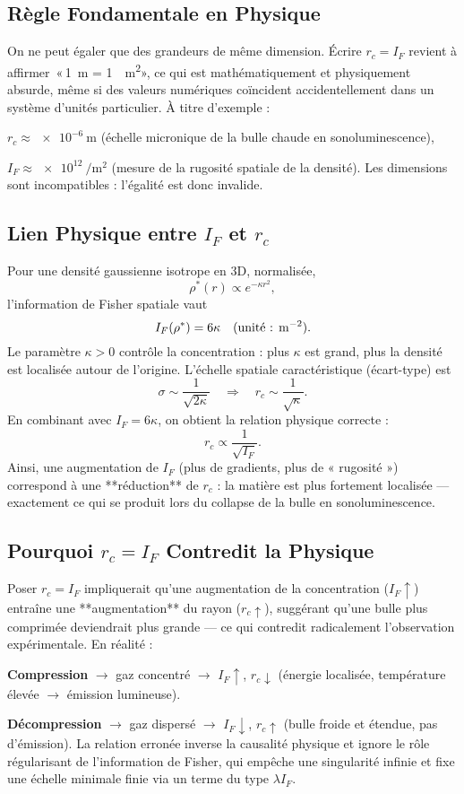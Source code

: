 \documentclass[a4paper,12pt]{article}
\begin{document}
\subsection{Règle Fondamentale en Physique}
On ne peut égaler que des grandeurs de même dimension.
Écrire \( r_c = I_F \) revient à affirmer~\textup{«}\,\SI{1}{\meter} = \SI{1}{\per\meter\squared}\textup{»},
ce qui est mathématiquement et physiquement absurde,
même si des valeurs numériques coïncident accidentellement dans un système d’unités particulier.
À titre d’exemple :
\item \( r_c \approx \SI{e-6}{\meter} \) (échelle micronique de la bulle chaude en sonoluminescence),
    \item \( I_F \approx \SI{e12}{\per\meter\squared} \) (mesure de la rugosité spatiale de la densité).
Les dimensions sont incompatibles : l’égalité est donc invalide.

\subsection{Lien Physique entre \( I_F \) et \( r_c \)}
Pour une densité gaussienne isotrope en 3D, normalisée,
\[
\rho^*(r) \propto e^{-\kappa r^2},
\]
l’information de Fisher spatiale vaut
\[
I_F(\rho^*) = 6\kappa \quad \text{(unité : \si{\per\meter\squared})}.
\]
Le paramètre \( \kappa > 0 \) contrôle la concentration : plus \( \kappa \) est grand, plus la densité est localisée autour de l’origine.
L’échelle spatiale caractéristique (écart-type) est
\[
\sigma \sim \frac{1}{\sqrt{2\kappa}} \quad \Rightarrow \quad r_c \sim \frac{1}{\sqrt{\kappa}}.
\]
En combinant avec \( I_F = 6\kappa \), on obtient la relation physique correcte :
\[
r_c \propto \frac{1}{\sqrt{I_F}}.
\]
Ainsi, une augmentation de \( I_F \) (plus de gradients, plus de « rugosité ») correspond à une **réduction** de \( r_c \) :
la matière est plus fortement localisée — exactement ce qui se produit lors du collapse de la bulle en sonoluminescence.

\subsection{Pourquoi \( r_c = I_F \) Contredit la Physique}
Poser \( r_c = I_F \) impliquerait qu’une augmentation de la concentration (\( I_F \uparrow \)) entraîne une **augmentation** du rayon (\( r_c \uparrow \)),
suggérant qu’une bulle plus comprimée deviendrait plus grande — ce qui contredit radicalement l’observation expérimentale.
En réalité :
\item \textbf{Compression} \(\rightarrow\) gaz concentré \(\rightarrow\) \( I_F \uparrow \), \( r_c \downarrow \)
    (énergie localisée, température élevée \(\rightarrow\) émission lumineuse).
    \item \textbf{Décompression} \(\rightarrow\) gaz dispersé \(\rightarrow\) \( I_F \downarrow \), \( r_c \uparrow \)
    (bulle froide et étendue, pas d’émission).
La relation erronée inverse la causalité physique et ignore le rôle régularisant de l’information de Fisher,
qui empêche une singularité infinie et fixe une échelle minimale finie via un terme du type \( \lambda I_F \).
\end{document}
